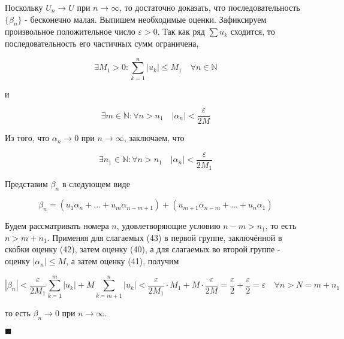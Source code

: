 Поскольку $U_n \rightarrow U$ при $n \rightarrow \infty$, то достаточно доказать, что последовательность $\{\beta_n\}$ - бесконечно малая. Выпишем необходимые оценки. Зафиксируем произвольное положительное число $\varepsilon > 0$. Так как ряд $\sum u_k$ сходится, то последовательность его частичных сумм ограничена,

\begin{equation}
	\exists M_1 > 0 \colon \displaystyle\sum_{k = 1}^n |u_k| \leqslant M_1\quad \forall n \in \mathbb{N}
\end{equation}

и

\begin{equation}
	\exists m \in \mathbb{N}\colon \forall n > n_1 \quad |\alpha_n| < \frac{\varepsilon}{2M}
\end{equation}

Из того, что $\alpha_n \rightarrow 0$ при $n \rightarrow \infty$, заключаем, что

\begin{equation}
	\exists n_1 \in \mathbb{N}\colon \forall n > n_1 \quad |\alpha_n| < \frac{\varepsilon}{2M_1}
\end{equation}

Представим $\beta_n$ в следующем виде

\begin{equation}
	\beta_n = (u_1\alpha_n + ... + u_m\alpha_{n - m + 1}) + (u_{m + 1}\alpha_{n - m} + ... + u_n\alpha_1)
\end{equation}

Будем рассматривать номера $n$, удовлетворяющие условию $n - m > n_1$, то есть $n > m + n_1$. Применяя для слагаемых (43) в первой группе, заключённой в скобки оценку (42), затем оценку (40), а для слагаемых во второй группе - оценку $|\alpha_n| \leqslant M$, а затем оценку (41), получим

\begin{equation*}
	|\beta_n| < \frac{\varepsilon}{2M_1}\displaystyle\sum_{k = 1}^m |u_k| + M\displaystyle\sum_{k = m + 1}^n |u_k| < \frac{\varepsilon}{2M_1} \cdot M_1 + M\cdot \frac{\varepsilon}{2M} = \frac{\varepsilon}{2} + \frac{\varepsilon}{2} = \varepsilon\quad \forall n > N = m + n_1
\end{equation*}

то есть $\beta_n \rightarrow 0$ при $n \rightarrow \infty$.

\begin{flushright}
	$\blacksquare$
\end{flushright}